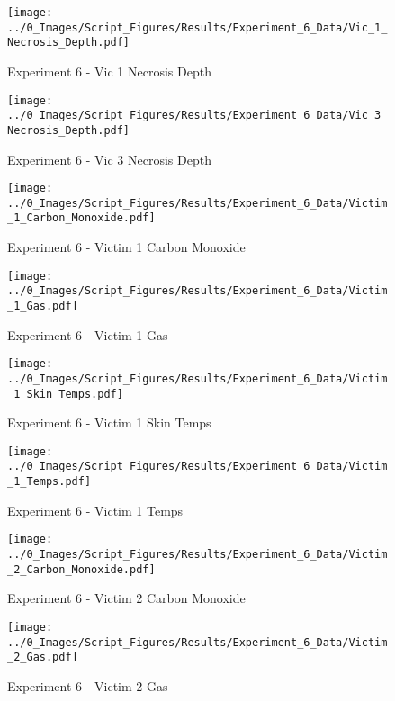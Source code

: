 	\clearpage

	\begin{figure}[H]
		\centering
		\texttt{[image: ../0\_Images/Script\_Figures/Results/Experiment\_6\_Data/Vic\_1\_Necrosis\_Depth.pdf]}
		\caption[]{Experiment 6 - Vic 1 Necrosis Depth}
	\end{figure}
 

	\begin{figure}[H]
		\centering
		\texttt{[image: ../0\_Images/Script\_Figures/Results/Experiment\_6\_Data/Vic\_3\_Necrosis\_Depth.pdf]}
		\caption[]{Experiment 6 - Vic 3 Necrosis Depth}
	\end{figure}
 
	\clearpage

	\begin{figure}[H]
		\centering
		\texttt{[image: ../0\_Images/Script\_Figures/Results/Experiment\_6\_Data/Victim\_1\_Carbon\_Monoxide.pdf]}
		\caption[]{Experiment 6 - Victim 1 Carbon Monoxide}
	\end{figure}
 

	\begin{figure}[H]
		\centering
		\texttt{[image: ../0\_Images/Script\_Figures/Results/Experiment\_6\_Data/Victim\_1\_Gas.pdf]}
		\caption[]{Experiment 6 - Victim 1 Gas}
	\end{figure}
 
	\clearpage

	\begin{figure}[H]
		\centering
		\texttt{[image: ../0\_Images/Script\_Figures/Results/Experiment\_6\_Data/Victim\_1\_Skin\_Temps.pdf]}
		\caption[]{Experiment 6 - Victim 1 Skin Temps}
	\end{figure}
 

	\begin{figure}[H]
		\centering
		\texttt{[image: ../0\_Images/Script\_Figures/Results/Experiment\_6\_Data/Victim\_1\_Temps.pdf]}
		\caption[]{Experiment 6 - Victim 1 Temps}
	\end{figure}
 
	\clearpage

	\begin{figure}[H]
		\centering
		\texttt{[image: ../0\_Images/Script\_Figures/Results/Experiment\_6\_Data/Victim\_2\_Carbon\_Monoxide.pdf]}
		\caption[]{Experiment 6 - Victim 2 Carbon Monoxide}
	\end{figure}
 

	\begin{figure}[H]
		\centering
		\texttt{[image: ../0\_Images/Script\_Figures/Results/Experiment\_6\_Data/Victim\_2\_Gas.pdf]}
		\caption[]{Experiment 6 - Victim 2 Gas}
	\end{figure}
 
